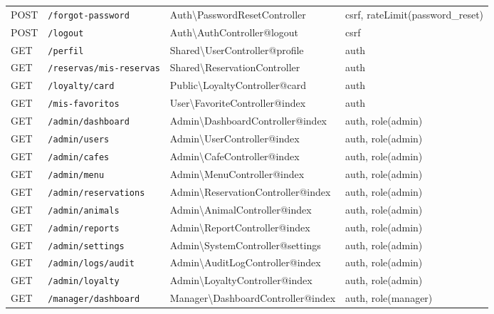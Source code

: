 \documentclass[12pt,a4paper,twoside,openright]{report}
\begin{document}
\begin{landscape}
\begin{longtable}{@{}llll@{}}
  POST & \texttt{/forgot-password}     & Auth\textbackslash PasswordResetController         & csrf, rateLimit(password\_reset)\\
  POST & \texttt{/logout}              & Auth\textbackslash AuthController@logout            & csrf\\
  GET  & \texttt{/perfil}              & Shared\textbackslash UserController@profile        & auth\\
  GET  & \texttt{/reservas/mis-reservas}& Shared\textbackslash ReservationController        & auth\\
  GET  & \texttt{/loyalty/card}        & Public\textbackslash LoyaltyController@card        & auth\\
  GET  & \texttt{/mis-favoritos}       & User\textbackslash FavoriteController@index        & auth\\
  GET  & \texttt{/admin/dashboard}     & Admin\textbackslash DashboardController@index      & auth, role(admin)\\
  GET  & \texttt{/admin/users}         & Admin\textbackslash UserController@index           & auth, role(admin)\\
  GET  & \texttt{/admin/cafes}         & Admin\textbackslash CafeController@index           & auth, role(admin)\\
  GET  & \texttt{/admin/menu}          & Admin\textbackslash MenuController@index           & auth, role(admin)\\
  GET  & \texttt{/admin/reservations}  & Admin\textbackslash ReservationController@index    & auth, role(admin)\\
  GET  & \texttt{/admin/animals}       & Admin\textbackslash AnimalController@index         & auth, role(admin)\\
  GET  & \texttt{/admin/reports}       & Admin\textbackslash ReportController@index         & auth, role(admin)\\
  GET  & \texttt{/admin/settings}      & Admin\textbackslash SystemController@settings      & auth, role(admin)\\
  GET  & \texttt{/admin/logs/audit}    & Admin\textbackslash AuditLogController@index       & auth, role(admin)\\
  GET  & \texttt{/admin/loyalty}       & Admin\textbackslash LoyaltyController@index        & auth, role(admin)\\
  GET  & \texttt{/manager/dashboard}   & Manager\textbackslash DashboardController@index   & auth, role(manager)\\

\end{longtable}
\end{landscape}
\end{document}
